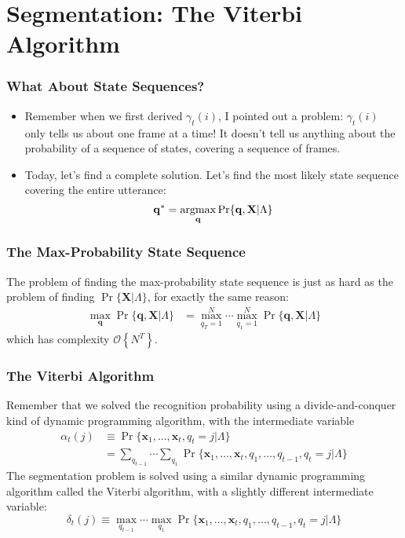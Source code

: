 \documentclass{beamer}
\newcommand{\argmax}{\operatornamewithlimits{argmax}}
\begin{document}
\section[Segmentation]{Segmentation: The Viterbi Algorithm}
\setcounter{subsection}{1}

\begin{frame}
  \frametitle{What About State Sequences?}

  \begin{itemize}
  \item Remember when we first derived $\gamma_t(i)$, I pointed out a
    problem: $\gamma_t(i)$ only tells us about one frame at a time!
    It doesn't tell us anything about the probability of a sequence of
    states, covering a sequence of frames.
  \item Today, let's find a complete solution.  Let's find the most
    likely state sequence covering the entire utterance:
    \[
    \mathbf{q}^*  = \argmax_{\mathbf{q}} \Pr\{\mathbf{q},\mathbf{X}|\Lambda\}
    \]
  \end{itemize}
\end{frame}

\begin{frame}
  \frametitle{The Max-Probability State Sequence}

  The problem of finding the max-probability state sequence is just as
  hard as the problem of finding $\Pr\{\mathbf{X}|\Lambda\}$, for exactly the same
  reason:
  \begin{align*}
    \max_{\mathbf{q}} \Pr\{{\mathbf{q}},\mathbf{X}|\Lambda\} &= \max_{q_T=1}^N\cdots\max_{q_1=1}^N \Pr\{{\mathbf{q}},\mathbf{X}|\Lambda\}
  \end{align*}
  which has complexity ${\mathcal O}\left\{N^T\right\}$.
\end{frame}
\begin{frame}
  \frametitle{The Viterbi Algorithm}
  
  Remember that we solved the recognition probability using a
  divide-and-conquer kind of dynamic programming algorithm, with the
  intermediate variable
  \begin{align*}
  \alpha_t(j) &\equiv \Pr\{\mathbf{x}_1,\ldots,\mathbf{x}_t,q_t=j|\Lambda\}\\
  &=\sum_{q_{t-1}}\cdots\sum_{q_1}
  \Pr\{\mathbf{x}_1,\ldots,\mathbf{x}_t,q_1,\ldots,q_{t-1},q_t=j|\Lambda\}
  \end{align*}
  The segmentation problem is solved using a similar dynamic
  programming algorithm called the Viterbi algorithm, with a slightly
  different intermediate variable:
  \[
  \delta_t(j)\equiv \max_{q_{t-1}}\cdots\max_{q_1}
  \Pr\{\mathbf{x}_1,\ldots,\mathbf{x}_t,q_1,\ldots,q_{t-1},q_t=j|\Lambda\}
  \]
\end{frame}
\end{document}
